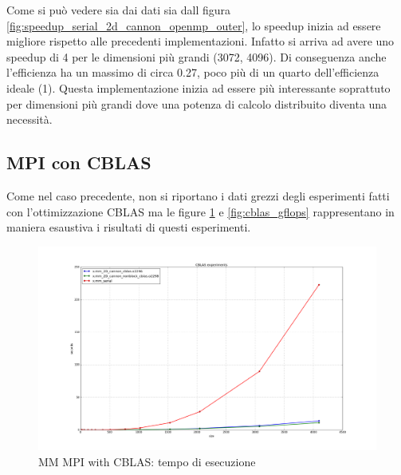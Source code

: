 Come si pu\`{o} vedere sia dai dati sia dall figura \ref{fig:speedup_serial_2d_cannon_openmp_outer}, lo speedup inizia ad essere migliore rispetto alle precedenti implementazioni. Infatto si arriva ad avere uno speedup di 4 per le dimensioni pi\`{u} grandi (3072, 4096). Di conseguenza anche l'efficienza ha un massimo di circa 0.27, poco pi\`{u} di un quarto dell'efficienza ideale (1).
Questa implementazione inizia ad essere pi\`{u} interessante soprattuto per dimensioni pi\`{u} grandi dove una potenza di calcolo distribuito diventa una necessit\`{a}.

\subsection{MPI con CBLAS}

Come nel caso precedente, non si riportano i dati grezzi degli esperimenti fatti con l'ottimizzazione CBLAS ma le figure \ref{fig:cblas_times} e \ref{fig:cblas_gflops} rappresentano in maniera esaustiva i risultati di questi esperimenti.

\begin{figure}[htbp]
    \begin{center}
        \includegraphics[width=15cm]{immagini/cblas_times.png}
    \end{center}
    \caption{MM MPI with CBLAS: tempo di esecuzione}
    \label{fig:cblas_times}
\end{figure}

